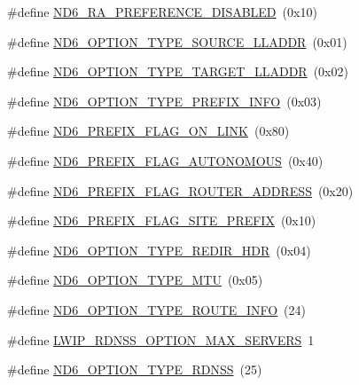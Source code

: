 \begin{DoxyCompactItemize}
\#define \hyperlink{openmote-cc2538_2lwip_2src_2include_2lwip_2prot_2nd6_8h_aaa9aac80d5537508978ea0ed1b6dcdac}{N\+D6\+\_\+\+R\+A\+\_\+\+P\+R\+E\+F\+E\+R\+E\+N\+C\+E\+\_\+\+D\+I\+S\+A\+B\+L\+ED}~(0x10)
\item 
\#define \hyperlink{openmote-cc2538_2lwip_2src_2include_2lwip_2prot_2nd6_8h_a68ce8550a20cd30093d6e79e1ca51842}{N\+D6\+\_\+\+O\+P\+T\+I\+O\+N\+\_\+\+T\+Y\+P\+E\+\_\+\+S\+O\+U\+R\+C\+E\+\_\+\+L\+L\+A\+D\+DR}~(0x01)
\item 
\#define \hyperlink{openmote-cc2538_2lwip_2src_2include_2lwip_2prot_2nd6_8h_a787edcc6357686798581dd714d68c8c1}{N\+D6\+\_\+\+O\+P\+T\+I\+O\+N\+\_\+\+T\+Y\+P\+E\+\_\+\+T\+A\+R\+G\+E\+T\+\_\+\+L\+L\+A\+D\+DR}~(0x02)
\item 
\#define \hyperlink{openmote-cc2538_2lwip_2src_2include_2lwip_2prot_2nd6_8h_a0225d4c8911efdbdbc2b40de208906c2}{N\+D6\+\_\+\+O\+P\+T\+I\+O\+N\+\_\+\+T\+Y\+P\+E\+\_\+\+P\+R\+E\+F\+I\+X\+\_\+\+I\+N\+FO}~(0x03)
\item 
\#define \hyperlink{openmote-cc2538_2lwip_2src_2include_2lwip_2prot_2nd6_8h_a5714faec71a571f2334ed750a33c61a2}{N\+D6\+\_\+\+P\+R\+E\+F\+I\+X\+\_\+\+F\+L\+A\+G\+\_\+\+O\+N\+\_\+\+L\+I\+NK}~(0x80)
\item 
\#define \hyperlink{openmote-cc2538_2lwip_2src_2include_2lwip_2prot_2nd6_8h_acc8f3704e72b27a166b120eec5a2665b}{N\+D6\+\_\+\+P\+R\+E\+F\+I\+X\+\_\+\+F\+L\+A\+G\+\_\+\+A\+U\+T\+O\+N\+O\+M\+O\+US}~(0x40)
\item 
\#define \hyperlink{openmote-cc2538_2lwip_2src_2include_2lwip_2prot_2nd6_8h_a0c8db370ade873d6af1c2fcb5b943808}{N\+D6\+\_\+\+P\+R\+E\+F\+I\+X\+\_\+\+F\+L\+A\+G\+\_\+\+R\+O\+U\+T\+E\+R\+\_\+\+A\+D\+D\+R\+E\+SS}~(0x20)
\item 
\#define \hyperlink{openmote-cc2538_2lwip_2src_2include_2lwip_2prot_2nd6_8h_a95d286358c4dd448e1967e3a03f25d27}{N\+D6\+\_\+\+P\+R\+E\+F\+I\+X\+\_\+\+F\+L\+A\+G\+\_\+\+S\+I\+T\+E\+\_\+\+P\+R\+E\+F\+IX}~(0x10)
\item 
\#define \hyperlink{openmote-cc2538_2lwip_2src_2include_2lwip_2prot_2nd6_8h_aeaa575c1a66ccaa2dc62ff2c0bd71619}{N\+D6\+\_\+\+O\+P\+T\+I\+O\+N\+\_\+\+T\+Y\+P\+E\+\_\+\+R\+E\+D\+I\+R\+\_\+\+H\+DR}~(0x04)
\item 
\#define \hyperlink{openmote-cc2538_2lwip_2src_2include_2lwip_2prot_2nd6_8h_aab6c15c9bea51fbdcc660f718bb403a8}{N\+D6\+\_\+\+O\+P\+T\+I\+O\+N\+\_\+\+T\+Y\+P\+E\+\_\+\+M\+TU}~(0x05)
\item 
\#define \hyperlink{openmote-cc2538_2lwip_2src_2include_2lwip_2prot_2nd6_8h_aff2e03766ee1fa15263c4aeda5097d28}{N\+D6\+\_\+\+O\+P\+T\+I\+O\+N\+\_\+\+T\+Y\+P\+E\+\_\+\+R\+O\+U\+T\+E\+\_\+\+I\+N\+FO}~(24)
\item 
\#define \hyperlink{openmote-cc2538_2lwip_2src_2include_2lwip_2prot_2nd6_8h_abf05527be6e826ea4b04b6103aa08497}{L\+W\+I\+P\+\_\+\+R\+D\+N\+S\+S\+\_\+\+O\+P\+T\+I\+O\+N\+\_\+\+M\+A\+X\+\_\+\+S\+E\+R\+V\+E\+RS}~1
\item 
\#define \hyperlink{openmote-cc2538_2lwip_2src_2include_2lwip_2prot_2nd6_8h_a3188b9704a8ca598f54b87c3db73272e}{N\+D6\+\_\+\+O\+P\+T\+I\+O\+N\+\_\+\+T\+Y\+P\+E\+\_\+\+R\+D\+N\+SS}~(25)
\end{DoxyCompactItemize}
